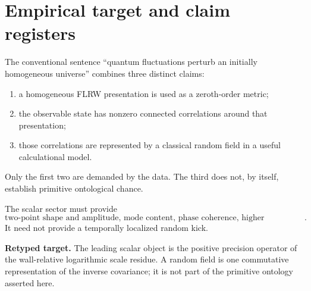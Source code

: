 \documentclass[11pt]{article}
\numberwithin{equation}{section}
\newcommand{\cz}{c^{(0)}}
\newcommand{\ct}{c^{(2)}}
\theoremstyle{definition}
\theoremstyle{remark}
\begin{document}
\begin{abstract}
Rank-one descent conditionally yields adiabaticity, superhorizon conservation, and passive coherent transfer. Higher-point predictions require the cubic and higher wavefunctional vertices derived from $\langle TTT\rangle$ and semilocal terms; they are not obtained by identifying higher derivatives of relative entropy directly with connected cosmological cumulants. The outstanding theorem is therefore sharp: construct the causal-wall algebra and state, prove the Weyl-source/BKM spectral weld, and compute $\cz(k)$, $\ct(k)$, and the higher stress correlators. The result is a non-stochastic formulation with a finite research target, not yet a microscopic completion.
\end{abstract}

\tableofcontents
\clearpage

\section{Empirical target and claim registers}

The conventional sentence ``quantum fluctuations perturb an initially homogeneous universe'' combines three distinct claims:
\begin{enumerate}
\item a homogeneous FLRW presentation is used as a zeroth-order metric;
\item the observable state has nonzero connected correlations around that presentation;
\item those correlations are represented by a classical random field in a useful calculational model.
\end{enumerate}
Only the first two are demanded by the data. The third does not, by itself, establish primitive ontological chance.

The scalar sector must provide
\begin{equation}
\boxed{
\text{two-point shape and amplitude, mode content, phase coherence, higher cumulants, and transfer laws}.}
\end{equation}
It need not provide a temporally localized random kick.

\begin{thesisbox}
\textbf{Retyped target.} The leading scalar object is the positive precision operator of the wall-relative logarithmic scale residue. A random field is one commutative representation of the inverse covariance; it is not part of the primitive ontology asserted here.
\end{thesisbox}
\end{document}
